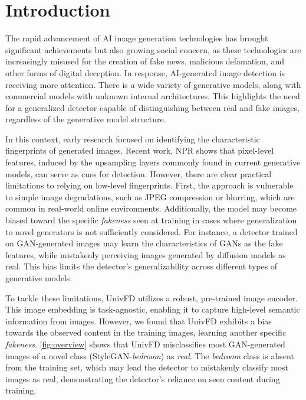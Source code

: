 \section{Introduction}
\label{sec:intro}





The rapid advancement of AI image generation technologies has brought significant achievements but also growing social concern, as these technologies are increasingly misused for the creation of fake news, malicious defamation, and other forms of digital deception. 
In response, AI-generated image detection is receiving more attention.
There is a wide variety of generative models, along with commercial models with unknown internal architectures.
This highlights the need for a generalized detector capable of distinguishing between real and fake images, regardless of the generative model structure.

In this context, early research focused on identifying the characteristic fingerprints of generated images.
Recent work, NPR\cite{tan2024rethinking} shows that pixel-level features, induced by the upsampling layers commonly found in current generative models, can serve as cues for detection.
However, there are clear practical limitations to relying on low-level fingerprints. 
First, the approach is vulnerable to simple image degradations, such as JPEG compression or blurring, which are common in real-world online environments\cite{wang2020cnn}.
Additionally, the model may become biased toward the specific \emph{fakeness} seen at training in cases where generalization to novel generators is not sufficiently considered\cite{ojha2023towards, zhu2023gendet}.
For instance, a detector trained on GAN-generated images may learn the characteristics of GANs as the fake features, while mistakenly perceiving images generated by diffusion models as real.
This bias limits the detector's generalizability across different types of generative models.

To tackle these limitations, UnivFD\cite{ojha2023towards} utilizes a robust, pre-trained image encoder.
This image embedding is task-agnostic, enabling it to capture high-level semantic information from images.
However, we found that UnivFD exhibits a bias towards the observed content in the training images, learning another specific \textit{fakeness}.
\cref{fig:overview} shows that UnivFD misclassifies most GAN-generated images of a novel class (StyleGAN-\textit{bedroom}) as \textit{real}.
The \textit{bedroom} class is absent from the training set, which may lead the detector to mistakenly classify most images as real, demonstrating the detector's reliance on seen content during training.

